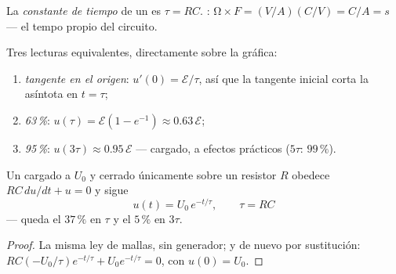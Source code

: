 \begin{definition}\label{def:g12:rc-rl-circuits:tau}
La \emph{constante de tiempo} de un  es
$\tau = RC$. : $\unit{\ohm} \times \unit{F} = (\unit{V/A})(\unit{C/V}) =
\unit{C/A} = \unit{s}$ --- el tempo propio del circuito.
\end{definition}

\begin{method}\label{met:g12:rc-rl-circuits:reading}
Tres lecturas equivalentes, directamente sobre la gráfica:
\begin{enumerate}
  \item \emph{tangente en el origen}: $u'(0) = \mathcal{E}/\tau$, así que la tangente
        inicial corta la asíntota en $t = \tau$;
  \item \emph{63\,\%}: $u(\tau) = \mathcal{E}(1 - e^{-1}) \approx 0.63\,\mathcal{E}$;
  \item \emph{95\,\%}: $u(3\tau) \approx 0.95\,\mathcal{E}$ --- cargado, a efectos
        prácticos ($5\tau$: $99\,\%$).
\end{enumerate}
\end{method}

\begin{proposition}[Descarga]\label{prop:g12:rc-rl-circuits:discharge}
Un  cargado a $U_0$ y cerrado únicamente sobre un resistor $R$ obedece
$RC\,du/dt + u = 0$ y sigue
\[
u(t) = U_0\,e^{-t/\tau}, \qquad \tau = RC
\]
--- queda el $37\,\%$ en $\tau$ y el $5\,\%$ en $3\tau$.
\end{proposition}

\begin{proof}
La misma ley de mallas, sin generador; y de nuevo por sustitución:
$RC(-U_0/\tau)e^{-t/\tau} + U_0 e^{-t/\tau} = 0$, con $u(0) = U_0$.
\end{proof}


